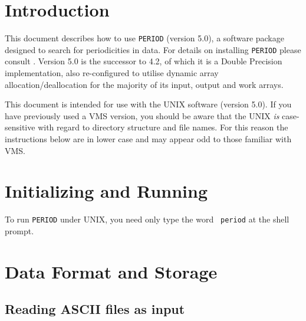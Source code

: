  \begin{latexonly}
   \setlength{\parskip}{0mm}
   \latexonlytoc
   \setlength{\parskip}{\medskipamount}
   \markboth{\stardocname}{\stardocname}
 \end{latexonly}
\newpage
\renewcommand{\thepage}{\arabic{page}}

\section{Introduction}
  
This document describes how to use {\tt PERIOD} (version 5.0), a
software package designed to search for periodicities in data.  For
details on installing {\tt PERIOD} please consult
.  Version 5.0 is the successor to 4.2, of which
it is a Double Precision implementation, also re-configured to utilise
dynamic array allocation/deallocation for the majority of its input,
output and work arrays.

This document is intended for use with the UNIX software (version
5.0). If you have previously used a VMS version, you should be aware
that the UNIX {\em is} case-sensitive with regard to directory
structure and file names.  For this reason the instructions below are
in lower case and may appear odd to those familiar with VMS.

\section{Initializing and Running}
 
To run {\tt PERIOD} under UNIX, you need only type the word {\tt
period} at the shell prompt.

\section{Data Format and Storage}
\label{slots}
 
\subsection{Reading ASCII files as input}
\label{slots1}

